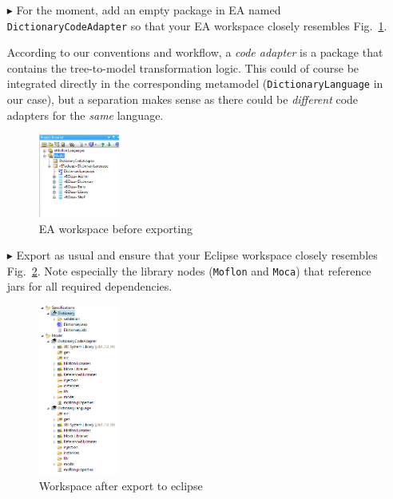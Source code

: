 \begin{enumerate}
\clearpage

\item[$\blacktriangleright$] For the moment, add an empty package in EA named \texttt{Dic\-tion\-ary\-Code\-Adapter} so that your EA workspace closely resembles Fig.~\ref{fig:moca-5-DictionaryMM-ProjectBrowser}.

According to our conventions and workflow, a \emph{code adapter} is a package that contains the tree-to-model transformation logic.
This could of course be integrated directly in the corresponding metamodel (\texttt{Dic\-tion\-ary\-Language} in our case), but a separation makes sense as there could be \emph{different} code adapters for the \emph{same} language.


\begin{figure}[!htbp]
\begin{center}
 \includegraphics[width=0.25\textwidth]{pics/moca/1DictionaryMetaModel/5-DictionaryMM-ProjectBrowser}
  \caption{EA workspace before exporting}
  \label{fig:moca-5-DictionaryMM-ProjectBrowser}
\end{center}
\end{figure}

\item[$\blacktriangleright$] Export as usual and ensure that your Eclipse workspace closely resembles Fig.~\ref{fig:moca-6-ExportToEclipse}.
Note especially the library nodes (\texttt{Moflon} and \texttt{Moca}) that reference jars for all required dependencies.

\begin{figure}[!htbp]
\begin{center}
 \includegraphics[width=0.25\textwidth]{pics/moca/1DictionaryMetaModel/6-ExportToEclipse}
  \caption{Workspace after export to eclipse}
  \label{fig:moca-6-ExportToEclipse}
\end{center}
\end{figure}


\end{enumerate}
